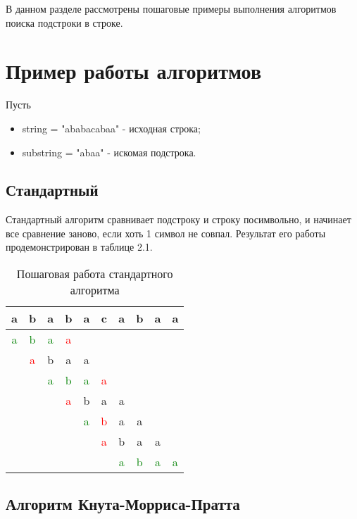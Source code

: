 \documentclass[a4paper,12pt]{report}
\begin{document}
В данном разделе рассмотрены пошаговые примеры выполнения алгоритмов поиска подстроки в строке.

\section{Пример работы алгоритмов}
Пусть
\begin{itemize}
\item string = "ababacabaa" - исходная строка;
\item substring = "abaa" - искомая подстрока.
\end{itemize} 

\subsection{Стандартный}

\hspace{0.6cm}Стандартный алгоритм сравнивает подстроку и строку посимвольно, и начинает все сравнение заново, если хоть 1 символ не совпал.
Результат его работы продемонстрирован в таблице 2.1.

\begin{table}[ht!]
\begin{center}
\caption{Пошаговая работа стандартного алгоритма}
\begin{tabular}{| c | c | c | c | c | c | c | c | c | c | }
	\hline
	a&b&a&b&a&c&a&b&a&a \\
	\hline
	\hline
	\textcolor{green}{a}&\textcolor{green}{b}&\textcolor{green}{a}&\textcolor{red}{a}&&&&&&\\
	\hline
	&\textcolor{red}{a}&b&a&a&&&&&\\
	\hline
	&&\textcolor{green}{a}&\textcolor{green}{b}&\textcolor{green}{a}&\textcolor{red}{a}&&&&\\
	\hline
	&&&\textcolor{red}{a}&b&a&a&&&\\
	\hline
	&&&&\textcolor{green}{a}&\textcolor{red}{b}&a&a&&\\
	\hline
	&&&&&\textcolor{red}{a}&b&a&a&\\
	\hline
	&&&&&&\textcolor{green}{a}&\textcolor{green}{b}&\textcolor{green}{a}&\textcolor{green}{a}\\
	\hline
\end{tabular}
\end{center}
\end{table}

\subsection{Алгоритм Кнута-Морриса-Пратта}
\end{document}
